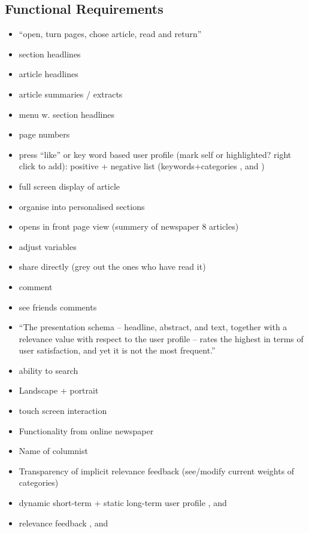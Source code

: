 \subsection{Functional Requirements}
\begin{itemize}
	\item ``open, turn pages, chose article, read and return'' \cite[p. 6]{FULLTEXT01.pdf}
	\item section headlines \cite[p. 6-7]{kristin_fredrik.pdf}
	\item article headlines
	\item article summaries / extracts \cite{fulltext.pdf}
	\item menu w. section headlines \cite[p. 8]{kristin_fredrik.pdf}
	\item page numbers \cite[p. 6-7]{kristin_fredrik.pdf}
	\item press ``like'' or key word based user profile (mark self or highlighted? right click to add): positive + negative list (keywords+categories \cite{10-1-1-19-5583}, \cite{fulltext.pdf} and \cite{gervasum2001ws.pdf})
	\item full screen display of article
	\item organise into personalised sections
	\item opens in front page view (summery of newspaper 8 articles) \cite[p. 8]{kristin_fredrik.pdf}
	\item adjust variables
	\item share directly (grey out the ones who have read it)
	\item comment
	\item see friends comments
	\item ``The presentation schema -- headline, abstract, and text, together with a relevance value with respect to the user profile -- rates the highest in terms of user satisfaction, and yet it is not the most frequent.'' \cite{Sections-categories-and-keywords-as-interest-specification-tools-for-personalised-news-services.pdf}
	\item  ability to search \cite[p. 7]{FULLTEXT01.pdf}
	\item Landscape + portrait \cite[p. 6-7]{kristin_fredrik.pdf}
	\item touch screen interaction \cite[p. 6-7]{kristin_fredrik.pdf}
	\item Functionality from online newspaper \cite{hcii2005_1004.pdf}
	\item Name of columnist \cite[p. 4]{gervasum2001ws.pdf}
	\item Transparency of implicit relevance feedback (see/modify current weights of categories) \cite[p. 7]{gervasum2001ws.pdf}
	\item dynamic short-term + static long-term user profile \cite{10-1-1-19-5583}, \cite{fulltext.pdf} and \cite{gervasum2001ws.pdf}
	\item relevance feedback \cite{10-1-1-19-5583}, \cite{fulltext.pdf} and \cite{gervasum2001ws.pdf}
\end{itemize}